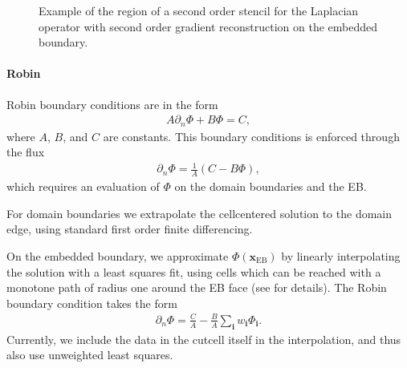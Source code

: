 \documentclass[letterpaper,10pt,english]{sphinxmanual}
\let\sphinxpxdimen\pdfpxdimen\else\newdimen\sphinxpxdimen
\begin{document}
\begin{figure}[htb]
\centering
\capstart

\noindent\sphinxincludegraphics[width=360\sphinxpxdimen]{{StencilRegion}.png}
\caption{Example of the region of a second order stencil for the Laplacian operator with second order gradient reconstruction on the embedded boundary.}\label{\detokenize{Source/LinearSolvers:id3}}\label{\detokenize{Source/LinearSolvers:fig-stencilregion}}\end{figure}


\paragraph{Robin}
\label{\detokenize{Source/LinearSolvers:robin}}
\sphinxAtStartPar
Robin boundary conditions are in the form
\begin{equation*}
\begin{split}A\partial_n\Phi + B\Phi = C,\end{split}
\end{equation*}
\sphinxAtStartPar
where \(A\), \(B\), and \(C\) are constants.
This boundary conditions is enforced through the flux
\begin{equation*}
\begin{split}\partial_n\Phi = \frac{1}{A}\left(C - B\Phi\right),\end{split}
\end{equation*}
\sphinxAtStartPar
which requires an evaluation of \(\Phi\) on the domain boundaries and the EB.

\sphinxAtStartPar
For domain boundaries we extrapolate the cell\sphinxhyphen{}centered solution to the domain edge, using standard first order finite differencing.

\sphinxAtStartPar
On the embedded boundary, we approximate \(\Phi\left(\mathbf{x}_{\text{EB}}\right)\) by linearly interpolating the solution with a least squares fit, using cells which can be reached with a monotone path of radius one around the EB face (see {\hyperref[\detokenize{Utilities/LeastSquares:chap-leastsquares}]{}} for details).
The Robin boundary condition takes the form
\begin{equation*}
\begin{split}\partial_n\Phi = \frac{C}{A} - \frac{B}{A}\sum_{\mathbf{i}} w_{\mathbf{i}}\Phi_{\mathbf{i}}.\end{split}
\end{equation*}
\sphinxAtStartPar
Currently, we include the data in the cut\sphinxhyphen{}cell itself in the interpolation, and thus also use unweighted least squares.
\end{document}
